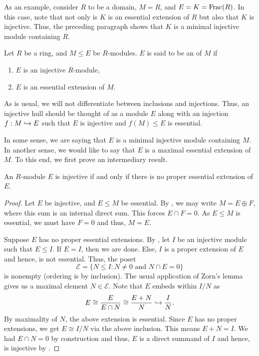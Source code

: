 As an example, consider $R$ to be a domain, $M = R$, and $E = K = \operatorname{Frac}(R)$. In this case, note that not only is $K$ is an essential extension of $R$ but also that $K$ is injective. Thus, the preceding paragraph shows that $K$ is a minimal injective module containing $R$.

\begin{defn}
	Let $R$ be a ring, and $M \le E$ be $R$-modules. $E$ is said to be an  of $M$ if 
	\begin{enumerate}
		\item $E$ is an injective $R$-module,
		\item $E$ is an essential extension of $M$.
	\end{enumerate}
\end{defn}

\begin{rem}
	As is usual, we will not differentiate between inclusions and injections. Thus, an injective hull should be thought of as a module $E$ along with an injection $f : M \hookrightarrow E$ such that $E$ is injective and $f(M) \le E$ is essential.
\end{rem}

In some sense, we are saying that $E$ is a minimal injective module containing $M$. In another sense, we would like to say that $E$ is a maximal essential extension of $M$. To this end, we first prove an intermediary result.

\begin{prop} \label{prop:injective-iff-no-proper-essential-extension}
	An $R$-module $E$ is injective if and only if there is no proper essential extension of $E$.
\end{prop}
\begin{proof} 
	\forward Let $E$ be injective, and $E \le M$ be essential. By , we may write $M = E \oplus F$, where this sum is an internal direct sum. This forces $E \cap F = 0$. As $E \le M$ is essential, we must have $F = 0$ and thus, $M = E$.

	\backward Suppose $E$ has no proper essential extensions. By , let $I$ be an injective module such that $E \le I$. If $E = I$, then we are done. Else, $I$ is a proper extension of $E$ and hence, is not essential. Thus, the poset
	\begin{equation*} 
		\mathcal{E} = \{N \le I : N \neq 0 \text{ and } N \cap E = 0\}
	\end{equation*}
	is nonempty (ordering is by inclusion). The usual application of Zorn's lemma gives us a maximal element $N \in \mathcal{E}$. Note that $E$ embeds within $I/N$ as
	\begin{equation*} 
		E \cong \frac{E}{E \cap N} \cong \frac{E + N}{N} \hookrightarrow \frac{I}{N}.
	\end{equation*}
	By maximality of $N$, the above extension is essential. Since $E$ has no proper extensions, we get $E \cong I/N$ via the above inclusion. This means $E + N = I$. We had $E \cap N = 0$ by construction and thus, $E$ is a direct summand of $I$ and hence, is injective by .
\end{proof}

